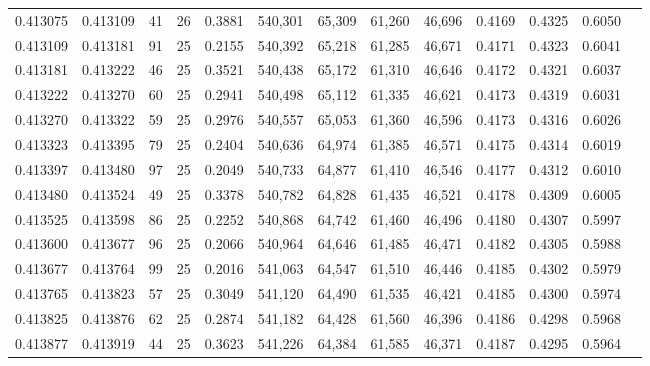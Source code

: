 \begin{tabular}{rrrrrrrrrrrrr}
0.413075 & 0.413109 &    41 &  26 &                                     0.3881 & 540,301 &  65,309 &  61,260 &  46,696 & 0.4169 & 0.4325 & 0.6050 \\
0.413109 & 0.413181 &    91 &  25 &                                     0.2155 & 540,392 &  65,218 &  61,285 &  46,671 & 0.4171 & 0.4323 & 0.6041 \\
0.413181 & 0.413222 &    46 &  25 &                                     0.3521 & 540,438 &  65,172 &  61,310 &  46,646 & 0.4172 & 0.4321 & 0.6037 \\
0.413222 & 0.413270 &    60 &  25 &                                     0.2941 & 540,498 &  65,112 &  61,335 &  46,621 & 0.4173 & 0.4319 & 0.6031 \\
0.413270 & 0.413322 &    59 &  25 &                                     0.2976 & 540,557 &  65,053 &  61,360 &  46,596 & 0.4173 & 0.4316 & 0.6026 \\
0.413323 & 0.413395 &    79 &  25 &                                     0.2404 & 540,636 &  64,974 &  61,385 &  46,571 & 0.4175 & 0.4314 & 0.6019 \\
0.413397 & 0.413480 &    97 &  25 &                                     0.2049 & 540,733 &  64,877 &  61,410 &  46,546 & 0.4177 & 0.4312 & 0.6010 \\
0.413480 & 0.413524 &    49 &  25 &                                     0.3378 & 540,782 &  64,828 &  61,435 &  46,521 & 0.4178 & 0.4309 & 0.6005 \\
0.413525 & 0.413598 &    86 &  25 &                                     0.2252 & 540,868 &  64,742 &  61,460 &  46,496 & 0.4180 & 0.4307 & 0.5997 \\
0.413600 & 0.413677 &    96 &  25 &                                     0.2066 & 540,964 &  64,646 &  61,485 &  46,471 & 0.4182 & 0.4305 & 0.5988 \\
0.413677 & 0.413764 &    99 &  25 &                                     0.2016 & 541,063 &  64,547 &  61,510 &  46,446 & 0.4185 & 0.4302 & 0.5979 \\
0.413765 & 0.413823 &    57 &  25 &                                     0.3049 & 541,120 &  64,490 &  61,535 &  46,421 & 0.4185 & 0.4300 & 0.5974 \\
0.413825 & 0.413876 &    62 &  25 &                                     0.2874 & 541,182 &  64,428 &  61,560 &  46,396 & 0.4186 & 0.4298 & 0.5968 \\
0.413877 & 0.413919 &    44 &  25 &                                     0.3623 & 541,226 &  64,384 &  61,585 &  46,371 & 0.4187 & 0.4295 & 0.5964 \\

\end{tabular}
